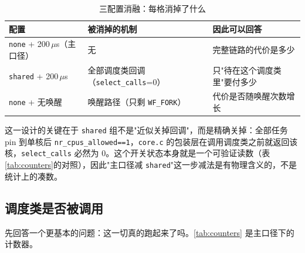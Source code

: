 \begin{table}[H]
\centering
\caption{三配置消融：每格消掉了什么}
\label{tab:ablation}
\small
\begin{tabular}{@{}>{\raggedright\arraybackslash}p{4.3cm}>{\raggedright\arraybackslash}p{4.5cm}>{\raggedright\arraybackslash}p{4.8cm}@{}}
\toprule
配置 & 被消掉的机制 & 因此可以回答 \\
\midrule
\texttt{none} + 200\,$\mu$s（主口径） & 无 & 完整链路的代价是多少 \\
\texttt{shared} + 200\,$\mu$s & 全部调度类回调（\texttt{select\_calls}=0） & 只"待在这个调度类里"要付多少 \\
\texttt{none} + 无唤醒 & 唤醒路径（只剩 \texttt{WF\_FORK}） & 代价是否随唤醒次数增长 \\
\bottomrule
\end{tabular}
\end{table}

这一设计的关键在于 \texttt{shared} 组不是"近似关掉回调"，而是精确关掉：全部任务 pin 到单核后 \texttt{nr\_cpus\_allowed==1}，\texttt{core.c} 的包装层在调用调度类之前就返回该核，\texttt{select\_calls} 必然为 0。这个开关状态本身就是一个可验证读数（表\ref{tab:counters}的对照），因此"主口径减 \texttt{shared}"这一步减法是有物理含义的，不是统计上的凑数。

\subsection{调度类是否被调用}

先回答一个更基本的问题：这一切真的跑起来了吗。\autoref{tab:counters} 是主口径下的计数器。

